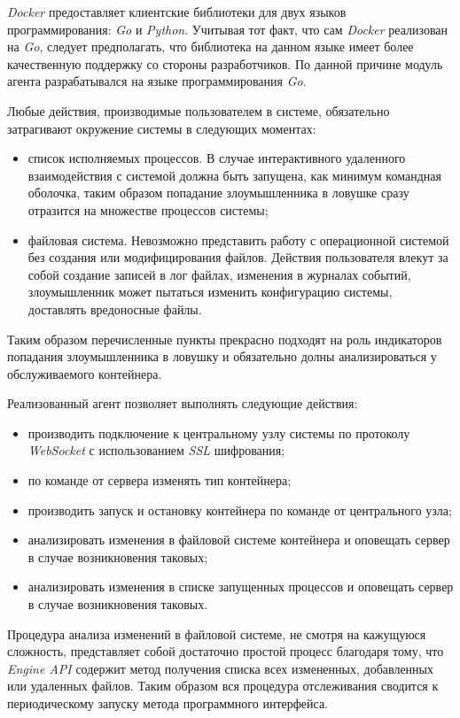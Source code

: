 \textit{Docker} предоставляет клиентские библиотеки для двух языков программирования: \textit{Go} и \textit{Python}. Учитывая тот факт, что сам \textit{Docker} реализован на \textit{Go}, следует предполагать, что библиотека на данном языке имеет более качественную поддержку со стороны разработчиков. По данной причине модуль агента разрабатывался на языке программирования \textit{Go}.

Любые действия, производимые пользователем в системе, обязательно затрагивают окружение системы в следующих моментах:
\begin{itemize}
	\item список исполняемых процессов. В случае интерактивного удаленного взаимодействия с системой должна быть запущена, как минимум командная оболочка, таким образом попадание злоумышленника в ловушке сразу отразится на множестве процессов системы;
	\item файловая система. Невозможно представить работу с операционной системой без создания или модифицирования файлов. Действия пользователя влекут за собой создание записей в лог файлах, изменения в журналах событий, злоумышленник может пытаться изменить конфигурацию системы, доставлять вредоносные файлы.
\end{itemize}

Таким образом перечисленные пункты прекрасно подходят на роль индикаторов попадания злоумышленника в ловушку и обязательно долны анализироваться у обслуживаемого контейнера.

Реализованный агент позволяет выполнять следующие действия:
\begin{itemize}
\item производить подключение к центральному узлу системы по протоколу \textit{WebSocket} с использованием \textit{SSL} шифрования;
\item по команде от сервера изменять тип контейнера;
\item производить запуск и остановку контейнера по команде от центрального узла;
\item анализировать изменения в файловой системе контейнера и оповещать сервер в случае возникновения таковых;
\item анализировать изменения в списке запущенных процессов и оповещать сервер в случае возникновения таковых.
\end{itemize}

Процедура анализа изменений в файловой системе, не смотря на кажущуюся сложность, представляет собой достаточно простой процесс благодаря тому, что \textit{Engine API} содержит метод получения списка всех измененных, добавленных или удаленных файлов. Таким образом вся процедура отслеживания сводится к периодическому запуску метода программного интерфейса.

